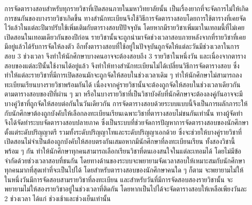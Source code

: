 \maketitle
\makesignature

\ifproject
\begin{abstractTH}
การจัดตารางสอบสำหรับทุกรายวิชาที่เปิดสอนภายในมหาวิทยาลัยนั้น
เป็นเรื่องยากที่จะจัดการไม่ให้เกิดการชนกันของบางรายวิชาเกิดขึ้น 
ทางสำนักทะเบียนจึงใช้วิธีการจัดตารางสอบโดยการใช้ตารางที่เคยจัดไว้แล้วในแต่ละปีมาปรับใช้เพิ่มเติมกับตารางสอบปีปัจจุบัน 
โดยหากมีรายวิชาเพิ่มมาในเทอมนี้ที่ไม่เคยเปิดสอนในเทอมเดียวกันของปีก่อน รายวิชานั้นจะถูกนำมาจัดช่วงเวลาสอบภายหลังจากที่รายวิชาที่เคยมีอยู่แล้วได้รับการจัดให้ลงตัว อีกทั้งตารางสอบที่ใช้อยู่ในปัจจุบันถูกจัดให้แต่ละวันมีช่วงเวลาในการสอบ 3 ช่วงเวลา
จึงทำให้นักศึกษาบางคนอาจจะต้องสอบถึง 3 รายวิชาในหนึ่งวัน และเนื่องจากตารางสอบของแต่ละปีนั้นใช้งานได้อยู่แล้ว
จึงทำให้ทางสำนักทะเบียนไม่ได้เปลี่ยนวิธีการจัดตารางสอบ ซึ่งทำให้แต่ละรายวิชาที่มีการเปิดสอนมักจะถูกจัดให้สอบในช่วงเวลาเดิม ๆ
ทำให้นักศึกษาไม่สามารถลงทะเบียนเรียนบางรายวิชาพร้อมกันได้ เนื่องจากคู่รายวิชานั้นจะต้องถูกจัดให้สอบในช่วงเวลาเดียวกันตามตารางสอบของปีที่ผ่าน ๆ มา 
หรือในบางรายวิชาที่เป็นวิชาบังคับที่นักศึกษาจะต้องลงคู่กันอาจจะมีบางคู่วิชาที่ถูกจัดให้สอบต่อกันในวันเดียวกัน
การจัดตารางสอบด้วยระบบแบบนี้จึงเป็นการผลักภาระให้กับนักศึกษาต้องถูกบังคับให้เลือกลงทะเบียนเรียนเฉพาะวิชาที่ตารางสอบไม่ชนกันเท่านั้น 
ทางผู้จัดทำจึงได้จัดทำระบบจัดตารางสอบปลายภาค ซึ่งเป็นระบบที่ช่วยจัดการปัญหาการจัดตารางสอบของนักศึกษา
ตั้งแต่ระดับปริญญาตรี รวมทั้งระดับปริญญาโทและระดับปริญญาเอกด้วย ซึ่งจะช่วยให้บางคู่รายวิชาที่เปิดสอนไม่จำเป็นต้องถูกบังคับให้สอบตรงกันเสมอหากมีนักศึกษาที่ลงทะเบียนเรียน
ทั้งสองวิชานี้พร้อม ๆ กัน ทำให้นักศึกษาทุกคนสามารถเลือกเรียนวิชาที่ตนเองสนใจในแต่ละเทอมได้ โดยไม่มีข้อจำกัดด้วยช่วงเวลาสอบที่ชนกัน
โดยทางด้านของระบบจะพยายามจัดเวลาสอบให้เหมาะสมกับนักศึกษาทุกคนมากที่สุดเท่าที่จะเป็นไปได้ โดยสำหรับตารางสอบของนักศึกษาคนใด ๆ ก็ตาม 
จะพยายามไม่ให้ในหนึ่งวันมีการจัดสอบสามรายวิชาที่ลงทะเบียน และสำหรับวันที่มีการจัดสอบสองรายวิชานั้น จะพยายามไม่ให้สองรายวิชาอยู่ในช่วงเวลาที่ติดกัน
โดยหากเป็นไปได้จะจัดตารางสอบให้เหลือเพียงวันละ 2 ช่วงเวลา ได้แก่ ช่วงเช้าและช่วงเย็นเท่านั้น

\end{abstractTH}


